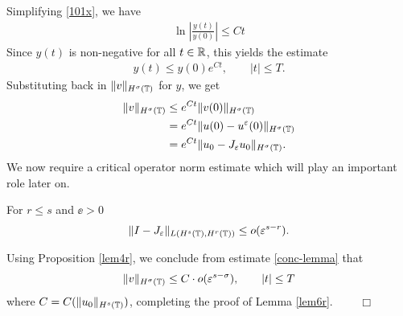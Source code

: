 Simplifying \eqref{101x}, we have
\begin{equation*}
	\begin{split}
		\ln \left |\frac{y(t)}{y(0)} \right | \le C t
	\end{split}
\end{equation*}
Since $y(t)$ is non-negative for all $t \in \mathbb{R}$, this yields the estimate
\begin{equation*}
	\begin{split}
		y(t) \le y(0) e^{C t}, \qquad |t| \le T.
	\end{split}
\end{equation*}
Substituting back in $\|v\|_{H^{\sigma}(\mathbb{T})}$ for $y$, we get
\begin{equation}
	\label{conc-lemma}
	\begin{split}
		\|v\|_{H^{\sigma}(\mathbb{T})}
		& \le e^{C t}\|v(0)\|_{H^{\sigma}(\mathbb{T})}
		\\
		& = e^{C t}\|u(0) - u^\varepsilon(0) \|_{H^{\sigma}(\mathbb{T})}
		\\
		& = e^{C t}\|u_0 - J_\varepsilon u_0 \|_{H^{\sigma}(\mathbb{T})}.
	\end{split}
\end{equation}
We now require a critical operator norm estimate which will play an
important role later on.
\begin{proposition}
	\label{lem4r}
	For $r \le s$ and $\ee>0$
	\begin{equation}
	\label{0r}
		\begin{split}
			\|I - J_\varepsilon\|_{L(H^s(\mathbb{T}), H^r(\mathbb{T}))} \le o(\varepsilon^{s-r}).
		\end{split}
	\end{equation}
\end{proposition}
Using Proposition \ref{lem4r}, we conclude from estimate \eqref{conc-lemma} that
\begin{equation*}
	\begin{split}
		\|v\|_{H^{\sigma}(\mathbb{T})} \le C \cdot o(\varepsilon^{s - \sigma}), \qquad |t|
		\le T
	\end{split}
\end{equation*}
where $C=C(\|u_0\|_{H^s(\mathbb{T})})$, completing the proof of Lemma \ref{lem6r}.
$\qquad \Box$
%
